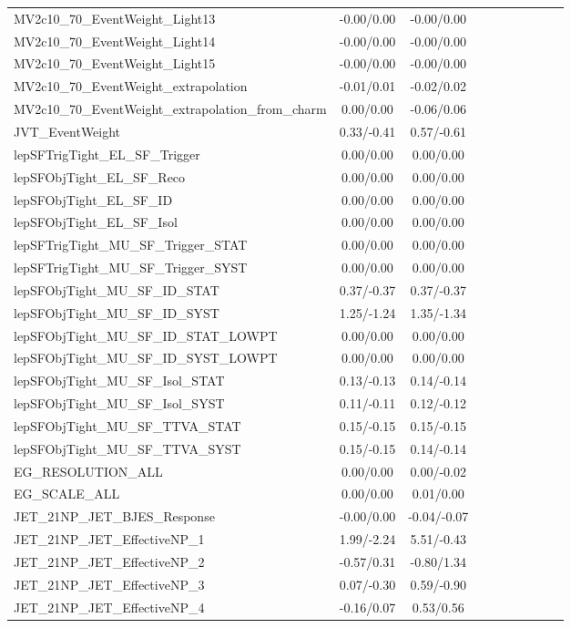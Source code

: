 \begin{table}[h]
\begin{center}
\begin{tabular}{l|ccccccccc}
MV2c10\_70\_EventWeight\_Light13 &-0.00/0.00 &-0.00/0.00 \\
MV2c10\_70\_EventWeight\_Light14 &-0.00/0.00 &-0.00/0.00 \\
MV2c10\_70\_EventWeight\_Light15 &-0.00/0.00 &-0.00/0.00 \\
MV2c10\_70\_EventWeight\_extrapolation &-0.01/0.01 &-0.02/0.02 \\
MV2c10\_70\_EventWeight\_extrapolation\_from\_charm &0.00/0.00 &-0.06/0.06 \\
JVT\_EventWeight &0.33/-0.41 &0.57/-0.61 \\
lepSFTrigTight\_EL\_SF\_Trigger &0.00/0.00 &0.00/0.00 \\
lepSFObjTight\_EL\_SF\_Reco &0.00/0.00 &0.00/0.00 \\
lepSFObjTight\_EL\_SF\_ID &0.00/0.00 &0.00/0.00 \\
lepSFObjTight\_EL\_SF\_Isol &0.00/0.00 &0.00/0.00 \\
lepSFTrigTight\_MU\_SF\_Trigger\_STAT &0.00/0.00 &0.00/0.00 \\
lepSFTrigTight\_MU\_SF\_Trigger\_SYST &0.00/0.00 &0.00/0.00 \\
lepSFObjTight\_MU\_SF\_ID\_STAT &0.37/-0.37 &0.37/-0.37 \\
lepSFObjTight\_MU\_SF\_ID\_SYST &1.25/-1.24 &1.35/-1.34 \\
lepSFObjTight\_MU\_SF\_ID\_STAT\_LOWPT &0.00/0.00 &0.00/0.00 \\
lepSFObjTight\_MU\_SF\_ID\_SYST\_LOWPT &0.00/0.00 &0.00/0.00 \\
lepSFObjTight\_MU\_SF\_Isol\_STAT &0.13/-0.13 &0.14/-0.14 \\
lepSFObjTight\_MU\_SF\_Isol\_SYST &0.11/-0.11 &0.12/-0.12 \\
lepSFObjTight\_MU\_SF\_TTVA\_STAT &0.15/-0.15 &0.15/-0.15 \\
lepSFObjTight\_MU\_SF\_TTVA\_SYST &0.15/-0.15 &0.14/-0.14 \\
EG\_RESOLUTION\_ALL &0.00/0.00 &0.00/-0.02 \\
EG\_SCALE\_ALL &0.00/0.00 &0.01/0.00 \\
JET\_21NP\_JET\_BJES\_Response &-0.00/0.00 &-0.04/-0.07 \\
JET\_21NP\_JET\_EffectiveNP\_1 &1.99/-2.24 &5.51/-0.43 \\
JET\_21NP\_JET\_EffectiveNP\_2 &-0.57/0.31 &-0.80/1.34 \\
JET\_21NP\_JET\_EffectiveNP\_3 &0.07/-0.30 &0.59/-0.90 \\
JET\_21NP\_JET\_EffectiveNP\_4 &-0.16/0.07 &0.53/0.56 \\

\end{tabular}
\end{center}
\end{table}
